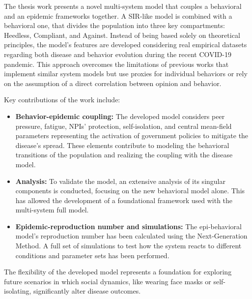 The thesis work presents a novel multi-system model that couples a behavioral and an epidemic frameworks together. A SIR-like model is combined with a behavioral one, that divides the population into three key compartments: Heedless, Compliant, and Against. Instead of being based solely on theoretical principles, the model's features are developed considering real empirical datasets regarding both disease and behavior evolution during the recent COVID-19 pandemic. This approach overcomes the limitations of previous works that implement similar system models but use proxies for individual behaviors or rely on the assumption of a direct correlation between opinion and behavior.

Key contributions of the work include:
\begin{itemize}
	\item \textbf{Behavior-epidemic coupling:} The developed model considers peer pressure, fatigue, NPIs' protection, self-isolation, and central mean-field parameters representing the activation of government policies to mitigate the disease's spread. These elements contribute to modeling the behavioral transitions of the population and realizing the coupling with the disease model.
	\item \textbf{Analysis:} To validate the model, an extensive analysis of its singular components is conducted, focusing on the new behavioral model alone. This has allowed the development of a foundational framework used with the multi-system full model.
	\item \textbf{Epidemic-reproduction number and simulations:} The epi-behavioral model's reproduction number has been calculated using the Next-Generation Method. A full set of simulations to test how the system reacts to different conditions and parameter sets has been performed.
\end{itemize}
The flexibility of the developed model represents a foundation for exploring future scenarios in which social dynamics, like wearing face masks or self-isolating, significantly alter disease outcomes.